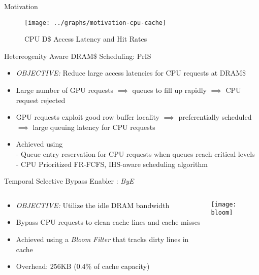 \documentclass[final,t]{beamer}
\newcommand*\circled[1]{\tikz[baseline=(char.base)]{
            \node[shape=circle,draw,inner sep=2pt] (char) {#1};}}
\begin{document}
\begin{frame}[t,fragile]{}
\begin{columns}[t]
\begin{column}{.47\linewidth}
\begin{exampleblock}{Motivation}
    \begin{figure}
       \texttt{[image: ../graphs/motivation-cpu-cache]}
       \caption{CPU D\$ Access Latency and Hit Rates}
       \label{fig:motivation-cpu-cache}
    \end{figure}  
        
    \end{exampleblock}
     
    \begin{exampleblock}{ \circled{1} Hetereogenity Aware DRAM\$ Scheduling: PrIS}
    \begin{itemize}
    	\item \emph{OBJECTIVE:} Reduce large access latencies for CPU requests at DRAM\$
    	\item Large number of GPU requests $\implies$ queues to fill up rapidly $\implies$ CPU request rejected
    	\item GPU requests exploit good row buffer locality $\implies$ preferentially scheduled $\implies$ large queuing latency for CPU requests
    	\item Achieved using \\
    	\qquad - Queue entry reservation for CPU requests when queues reach critical levels \\
    	\qquad - CPU Prioritized FR-FCFS, IHS-aware scheduling algorithm
    \end{itemize} 
	\end{exampleblock}
	
    \begin{exampleblock}{\circled{3} Temporal Selective Bypass Enabler : \textit{ByE}}
    	\begin{columns} [T]
    		\begin{column}{0.6\linewidth}
    	    \begin{itemize}
    	    	\item \emph{OBJECTIVE:} Utilize the idle DRAM bandwidth
    	    	\item Bypass CPU requests to clean cache lines and cache misses
    	    	\item Achieved using a \textit{Bloom Filter} that tracks dirty lines in cache
    	    	\item Overhead: 256KB (0.4\% of cache capacity)
    	    \end{itemize}     			
    		\end{column}
    		\begin{column}{0.4\linewidth}
    	        \centering
    	    	\texttt{[image: bloom]} 
    	    \end{column}
    	\end{columns}
	\end{exampleblock}
	

\end{column}
\end{columns}
\end{frame}
\end{document}
